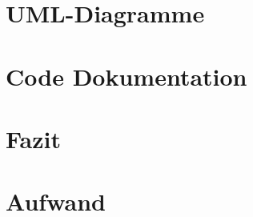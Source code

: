 \documentclass[a4paper]{article}
\begin{document}
\section{UML-Diagramme}

\section{Code Dokumentation}

\section{Fazit}

\section{Aufwand}
\end{document}
